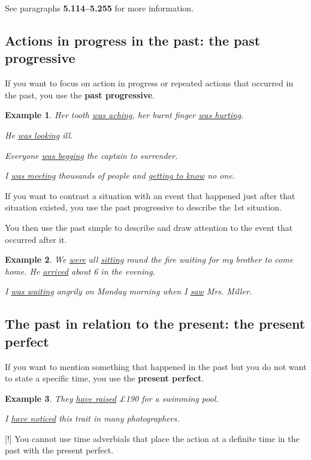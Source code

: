 \documentclass[oneside]{book}
\numberwithin{equation}{section}
\newtheorem{example}{Example}[section]
\begin{document}
See paragraphs \textbf{5.114--5.255} for more information.

\subsection{Actions in progress in the past: the past progressive}
\noindent{} If you want to focus on action in progress or repeated actions that occurred in the past, you use the \textbf{past progressive}.
\begin{example}
    Her tooth \underline{was aching}, her burnt finger \underline{was hurting}.
    
    He \underline{was looking} ill.
    
    Everyone \underline{was begging} the captain to surrender.
    
    I \underline{was meeting} thousands of people and \underline{getting to know} no one.
\end{example}
%
\noindent{} If you want to contrast a situation with an event that happened just after that situation existed, you use the past progressive to describe the 1st situation.

You then use the past simple to describe and draw attention to the event that occurred after it.
\begin{example}
    We \underline{were} all \underline{sitting} round the fire waiting for my brother to come home. He \underline{arrived} about 6 in the evening.
    
    I \underline{was waiting} angrily on Monday morning when I \underline{saw} Mrs. Miller.
\end{example}

\subsection{The past in relation to the present: the present perfect}
\noindent{} If you want to mention something that happened in the past but you do not want to state a specific time, you use the \textbf{present perfect}.
\begin{example}
    They \underline{have raised} \pounds190 for a swimming pool.
    
    I \underline{have noticed} this trait in many photographers.
\end{example}
%
\noindent{} [!] You cannot use time adverbials that place the action at a definite time in the past with the present perfect.
\end{document}
